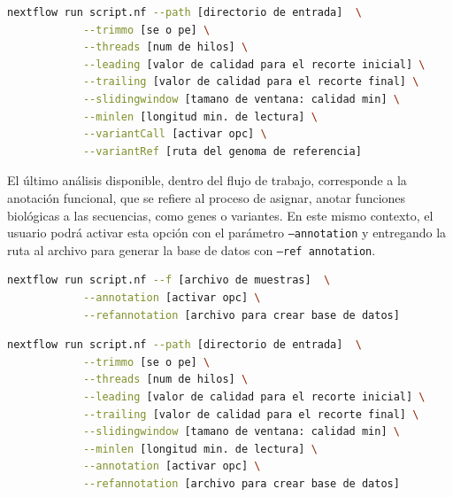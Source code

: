 \documentclass[12pt]{article}
\begin{document}
\begin{center}
    \begin{lstlisting}[language=bash, caption=Comando para la ejecución de un análisis de llamado de variantes \emph{(elaboración propia)}., label=lst:VARIANTES]
        nextflow run script.nf --path [directorio de entrada]  \
            --trimmo [se o pe] \
            --threads [num de hilos] \
            --leading [valor de calidad para el recorte inicial] \
            --trailing [valor de calidad para el recorte final] \
            --slidingwindow [tamano de ventana: calidad min] \
            --minlen [longitud min. de lectura] \
            --variantCall [activar opc] \
            --variantRef [ruta del genoma de referencia]
    \end{lstlisting}
\end{center}

El último análisis disponible, dentro del flujo de trabajo, 
corresponde a  la anotación funcional, que se refiere al 
proceso de asignar, anotar funciones biológicas a las secuencias, 
como genes o variantes. En este mismo contexto, el usuario podrá 
activar esta opción con el parámetro \texttt{--annotation} y entregando la
ruta al archivo para generar la base de datos con \texttt{--ref annotation}.

\begin{center}
    \begin{lstlisting}[language=bash, caption=Comando para ejecutar un análisis rápido de anotación funcional \emph{(elaboración propia)}., label=lst:annotationFast]
        nextflow run script.nf --f [archivo de muestras]  \
            --annotation [activar opc] \
            --refannotation [archivo para crear base de datos]
    \end{lstlisting}
\end{center}

\begin{center}
    \begin{lstlisting}[language=bash, caption=Comando para la ejecución de una anotación funcional \emph{(elaboración propia)}., label=lst:ANNOTATION]
        nextflow run script.nf --path [directorio de entrada]  \
            --trimmo [se o pe] \
            --threads [num de hilos] \
            --leading [valor de calidad para el recorte inicial] \
            --trailing [valor de calidad para el recorte final] \
            --slidingwindow [tamano de ventana: calidad min] \
            --minlen [longitud min. de lectura] \
            --annotation [activar opc] \
            --refannotation [archivo para crear base de datos]
    \end{lstlisting}
\end{center}
\end{document}
